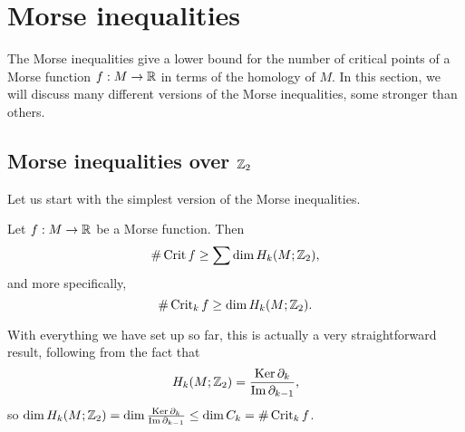 \section{Morse inequalities}
The Morse inequalities give a lower bound for the number of critical points of a Morse function $f:M \to  \mathbb{R}$ in terms of the homology of $M$.
In this section, we will discuss many different versions of the Morse inequalities, some stronger than others.

\subsection{Morse inequalities over $\mathbb{Z}_2$}
Let us start with the simplest version of the Morse inequalities.

\begin{theorem}
    Let $f: M \to  \mathbb{R}$ be a Morse function. Then
    \[
        \# \operatorname{Crit} f \ge \sum \dim H_k(M; \mathbb{Z}_2)
    ,\]
    and more specifically,
    \[
        \# \operatorname{Crit}_k f \ge \dim H_k(M; \mathbb{Z}_2)
    .\]
\end{theorem}
\begin{myproof}
    With everything we have set up so far, this is actually a very straightforward result, following from the fact that \[
    H_k(M; \mathbb{Z}_2) = \frac{\operatorname{Ker} \partial_k}{\operatorname{Im} \partial_{k-1}},
    \] so $\dim H_k(M; \mathbb{Z}_2) = \dim \frac{\operatorname{Ker} \partial_k}{\operatorname{Im} \partial_{k-1}} \le  \dim C_k = \# \operatorname{Crit}_k f$.
\end{myproof}

